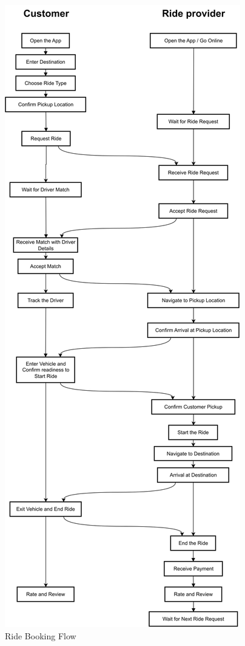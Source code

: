 \begin{figure}[H]
    \centering
    \includegraphics[width=0.99\linewidth, height=0.85\textheight, keepaspectratio]{data/ride-flow.svg}
    \caption{Ride Booking Flow}
    \label{fig:RideBookingFlow}
\end{figure}

